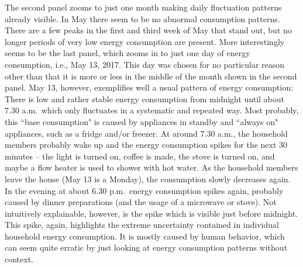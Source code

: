 The second panel zooms to just one month making daily fluctuation patterns already visible. In May there seem to be no abnormal consumption patterns. There are a few peaks in the first and third week of May that stand out, but no longer periods of very low energy consumption are present. More interestingly seems to be the last panel, which zooms in to just one day of energy consumption, i.e., May 13, 2017. This day was chosen for no particular reason other than that it is more or less in the middle of the month shown in the second panel. May 13, however, exemplifies well a usual pattern of energy consumption: There is low and rather stable energy consumption from midnight until about 7.30 a.m.~which only fluctuates in a systematic and repeated way. Most probably, this ``base consumption" is caused by appliances in standby and ``always on" appliances, such as a fridge and/or freezer. At around 7.30 a.m., the household members probably wake up and the energy consumption spikes for the next 30 minutes -- the light is turned on, coffee is made, the stove is turned on, and maybe a flow heater is used to shower with hot water. As the household members leave the house (May 13 is a Monday), the consumption slowly decreases again. In the evening at about 6.30 p.m.~energy consumption spikes again, probably caused by dinner preparations (and the usage of a microwave or stove). Not intuitively explainable, however, is the spike which is visible just before midnight. This spike, again, highlights the extreme uncertainty contained in individual household energy consumption. It is mostly caused by human behavior, which can seem quite erratic by just looking at energy consumption patterns without context.

